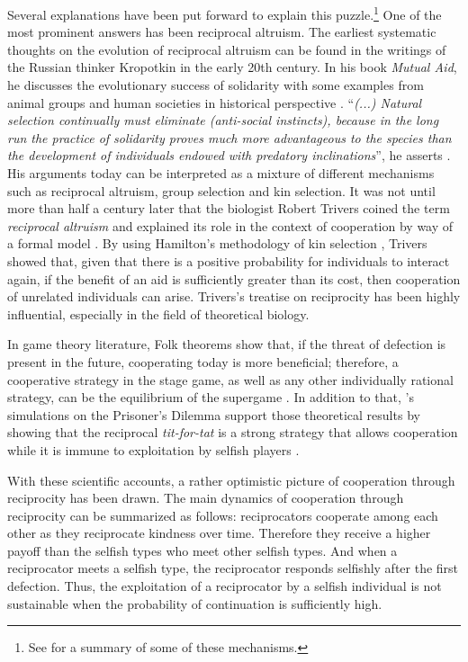 \documentclass[12pt]{article}
\begin{document}
 Several explanations have been put forward to explain this puzzle.\footnote{See \citet{Nowak2006} for a summary of some of these mechanisms.} One of the most prominent answers has been reciprocal altruism. The earliest systematic thoughts on the evolution of reciprocal altruism can be found in the writings of the Russian thinker Kropotkin in the early 20th century. In his book \textit{Mutual Aid}, he discusses the evolutionary success of solidarity with some examples from animal groups and human societies in historical perspective \citep{Kropotkin1902-mo}. ``\textit{(...) Natural selection continually must eliminate (anti-social instincts), because in the long run the practice of solidarity proves much more advantageous to the species than the development of individuals endowed with predatory inclinations}'', he asserts \citep[p.~18]{Kropotkin1902-mo}. His arguments today can be interpreted as a mixture of different mechanisms such as reciprocal altruism, group selection and kin selection. It was not until more than half a century later that the biologist Robert Trivers coined the term \textit{reciprocal altruism} and explained its role in the context of cooperation by way of a formal model \citep{Trivers1971}. By using Hamilton's methodology of kin selection \citep{Hamilton1964}, Trivers showed that, given that there is a positive probability for individuals to interact again, if the benefit of an aid is sufficiently greater than its cost, then cooperation of unrelated individuals can arise. Trivers's treatise on reciprocity has been highly influential, especially in the field of theoretical biology. 

In game theory literature, Folk theorems show that, if the threat of defection is present in the future, cooperating today is more beneficial; therefore, a cooperative strategy in the stage game, as well as any other individually rational strategy, can be the equilibrium of the supergame \citep{Friedman1971-nz, Fudenberg1986-dz}. In addition to that, \citeauthor{Axelrod1980a}'s simulations on the Prisoner's Dilemma  support those theoretical results by showing that the reciprocal \textit{tit-for-tat} is a strong strategy that allows cooperation while it is immune to exploitation by selfish players \citep{Axelrod1980a,Axelrod1980b,Axelrod1981-ot}. 

With these scientific accounts, a rather optimistic picture of cooperation through reciprocity has been drawn. The main dynamics of cooperation through reciprocity can be summarized as follows: reciprocators cooperate among each other as they reciprocate kindness over time. Therefore they receive a higher payoff than the selfish types who meet other selfish types. And when a reciprocator meets a selfish type, the reciprocator responds selfishly after the first defection. Thus, the exploitation of a reciprocator by a selfish individual is not sustainable when the probability of continuation is sufficiently high. 
\end{document}
